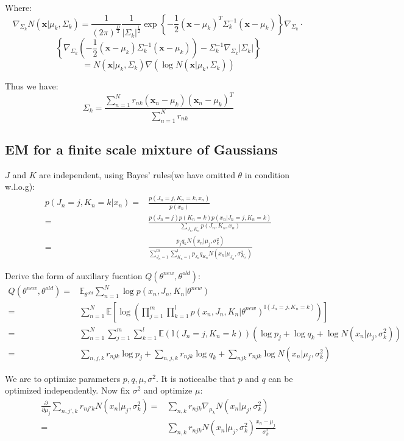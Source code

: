 \documentclass[UTF8]{ctexart}
\begin{document}
Where:
$$\nabla_{\Sigma_{k}}N(\textbf{x}|\mu_{k},\Sigma_{k})=\frac{1}{(2\pi)^{\frac{D}{2}}}\frac{1}{|\Sigma_{k}|^{\frac{1}{2}}}\exp\left\{ -\frac{1}{2}(\textbf{x}-\mu_{k})^{T}\Sigma_{k}^{-1}(\textbf{x}-\mu_{k}) \right\}\nabla_{\Sigma_{k}}\cdot$$
$$\left\{ \nabla_{\Sigma_{k}}(-\frac{1}{2}(\textbf{x}-\mu_{k})\Sigma_{k}^{-1}(\textbf{x}-\mu_{k}))-\Sigma_{k}^{-1}\nabla_{\Sigma_{k}}|\Sigma_{k}| \right\}$$
$$=N(\textbf{x}|\mu_{k},\Sigma_{k})\nabla(\log N(\textbf{x}|\mu_{k},\Sigma_{k}))$$

Thus we have:
$$\Sigma_{k}=\frac{\sum_{n=1}^{N}r_{nk}(\textbf{x}_{n}-\mu_{k})(\textbf{x}_{n}-\mu_{k})^{T}}{\sum_{n=1}^{N}r_{nk}}$$

\subsection{EM for a finite scale mixture of Gaussians}
$J$ and $K$ are independent, using Bayes' rules(we have omitted $\theta$ in condition w.l.o.g):
\begin{align}
p(J_{n}=j,K_{n}=k|x_{n})=&\frac{p(J_{n}=j,K_{n}=k,x_{n})}{p(x_{n})}\nonumber \\
=&\frac{p(J_{n}=j)p(K_{n}=k)p(x_{n}|J_{n}=j,K_{n}=k)}{\sum_{J_{n},K_{n}}p(J_{n},K_{n},x_{n})}\nonumber \\
=&\frac{p_{j}q_{k}N(x_{n}|\mu_{j},\sigma^{2}_{k})}{\sum_{J_{n}=1}^{m}\sum_{K_{n}=1}^{l}p_{J_{n}}q_{K_{n}}N(x_{n}|\mu_{J_{n}},\sigma^{2}_{K_{n}})}\nonumber
\end{align}

Derive the form of auxiliary fucntion $Q(\theta^{new},\theta^{old})$:
\begin{align}
Q(\theta^{new},\theta^{old})=&\mathbb{E}_{\theta^{old}}\sum_{n=1}^{N}\log p(x_{n},J_{n},K_{n}|\theta^{new})\nonumber \\
=&\sum_{n=1}^{N}\mathbb{E}[\log(\prod_{j=1}^{m}\prod_{k=1}^{l} p(x_{n},J_{n},K_{n}|\theta^{new})^{\mathbb{I}(J_{n}=j,K_{n}=k)} )]\nonumber \\
=&\sum_{n=1}^{N}\sum_{j=1}^{m}\sum_{k=1}^{l}\mathbb{E}(\mathbb{I}(J_{n}=j,K_{n}=k))(\log p_{j} + \log q_{k} + \log N(x_{n}|\mu_{j},\sigma^{2}_{k}))\nonumber \\
=&\sum_{n,j,k}r_{njk}\log p_{j} + \sum_{n,j,k}r_{njk}\log q_{k} + \sum_{njk}r_{njk}\log N(x_{n}|\mu_{j},\sigma^{2}_{k})\nonumber
\end{align}

We are to optimize parameters $p,q,\mu,\sigma^{2}$. It is noticealbe that $p$ and $q$ can be optimized independently. Now fix $\sigma^{2}$ and optimize $\mu$:
\begin{align}
\frac{\partial}{\partial \mu_{j}}\sum_{n,j',k}r_{nj'k}N(x_{n}|\mu_{j},\sigma^{2}_{k})=&\sum_{n,k}r_{njk}\nabla_{\mu_{k}}N(x_{n}|\mu_{j},\sigma^{2}_{k})\nonumber \\
=&\sum_{n,k}r_{njk}N(x_{n}|\mu_{j},\sigma^{2}_{k})\frac{x_{n}-\mu_{j}}{\sigma^{2}_{k}}\nonumber 
\end{align}
\end{document}
